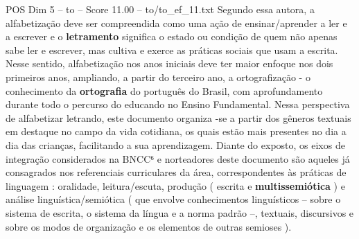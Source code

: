 \begin{textsample}{POS Dim 5 – to – Score 11.00 – to/to\_ef\_11.txt}
Segundo essa autora, a alfabetização deve ser compreendida como uma ação de ensinar/aprender a ler e a escrever e o \textbf{letramento} significa o estado ou condição de quem não apenas sabe ler e escrever, mas cultiva e exerce as práticas sociais que usam a escrita.
Nesse sentido, alfabetização nos anos iniciais deve ter maior enfoque nos dois primeiros anos, ampliando, a partir do terceiro ano, a ortografização - o conhecimento da \textbf{ortografia} do português do Brasil, com aprofundamento durante todo o percurso do educando no Ensino Fundamental.
Nessa perspectiva de alfabetizar letrando, este documento organiza -se a partir dos gêneros textuais em destaque no campo da vida cotidiana, os quais estão mais presentes no dia a dia das crianças, facilitando a sua aprendizagem.
Diante do exposto, os eixos de integração considerados na BNCC⁶ e norteadores deste documento são aqueles já consagrados nos referenciais curriculares da área, correspondentes às práticas de linguagem : oralidade, leitura/escuta, produção ( escrita e \textbf{multissemiótica} ) e análise linguística/semiótica ( que envolve conhecimentos linguísticos – sobre o sistema de escrita, o sistema da língua e a norma padrão –, textuais, discursivos e sobre os modos de organização e os elementos de outras semioses ).

\end{textsample}
